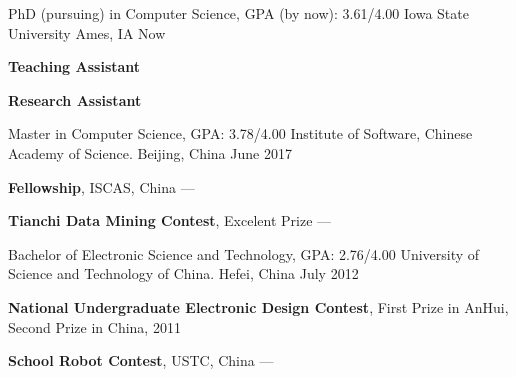 
\begin{cventries}

  \cventry
    {PhD (pursuing) in Computer Science, GPA (by now): 3.61/4.00} %
    {Iowa State University} %
    {Ames, IA} %
    {Now} %
    {
      \begin{cvitems} %
         \item {\textbf{Teaching Assistant} }
         \vspace{0.5mm}
         \item {\textbf{Research Assistant} }
      \end{cvitems}
    }

  \cventry
    {Master in Computer Science, GPA: 3.78/4.00} %
    {Institute of Software, Chinese Academy of Science.} %
    {Beijing, China} %
    {June 2017} %
    {
      \begin{cvitems} %
         \item {\textbf{Fellowship}, ISCAS, China --- }
         \vspace{0.5mm}
         \item {\textbf{Tianchi Data Mining Contest}, Excelent Prize --- }
      \end{cvitems}
    }

  \cventry
    {Bachelor of Electronic Science and Technology, GPA: 2.76/4.00}
    {University of Science and Technology of China.}
    {Hefei, China}
    {July 2012}
    {
      \begin{cvitems}
        \item {\textbf{National Undergraduate Electronic Design Contest}, First Prize in AnHui, Second Prize in China, 2011}
        \vspace{0.5mm}
        \item {\textbf{School Robot Contest}, USTC, China --- }
        \vspace{0.5mm}
      \end{cvitems}
    }
\end{cventries}
